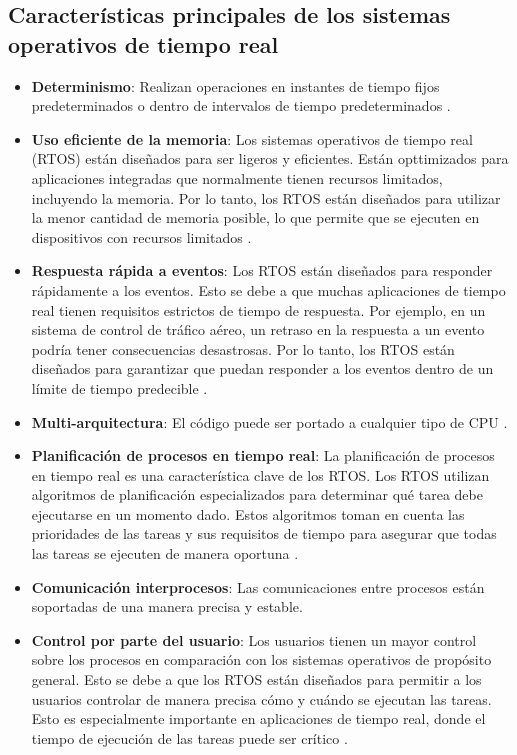 \documentclass{article}
\begin{document}
\subsection{ Características principales de los sistemas operativos de tiempo real}
\begin{itemize}
  \item \textbf{Determinismo}: Realizan operaciones en instantes de tiempo fijos predeterminados o dentro de intervalos de
  tiempo predeterminados \cite{ref1}.

  \item \textbf{Uso eficiente de la memoria}: Los sistemas operativos de tiempo real (RTOS) están diseñados para ser
  ligeros y eficientes. Están opttimizados para aplicaciones integradas que normalmente tienen recursos limitados,
  incluyendo la memoria. Por lo tanto, los RTOS están diseñados para utilizar la menor cantidad de memoria
  posible, lo que permite que se ejecuten en dispositivos con recursos limitados \cite{ref2}.
  
  \item \textbf{Respuesta rápida a eventos}: Los RTOS están diseñados para responder rápidamente a los eventos. Esto se
  debe a que muchas aplicaciones de tiempo real tienen requisitos estrictos de tiempo de respuesta. Por ejemplo,
  en un sistema de control de tráfico aéreo, un retraso en la respuesta a un evento podría tener consecuencias
  desastrosas. Por lo tanto, los RTOS están diseñados para garantizar que puedan responder a los eventos dentro
  de un límite de tiempo predecible \cite{ref2} \cite{ref6}.

  \item \textbf{Multi-arquitectura}: El código puede ser portado a cualquier tipo de CPU \cite{ref1} \cite{ref2}.
  
  \item \textbf{Planificación de procesos en tiempo real}: La planificación de procesos en tiempo real es una característica
  clave de los RTOS. Los RTOS utilizan algoritmos de planificación especializados para determinar qué tarea
  debe ejecutarse en un momento dado. Estos algoritmos toman en cuenta las prioridades de las tareas y sus
  requisitos de tiempo para asegurar que todas las tareas se ejecuten de manera oportuna \cite{ref1} \cite{ref2}.
  
  \item \textbf{Comunicación interprocesos}: Las comunicaciones entre procesos están soportadas de una manera precisa
  y estable.
  
  \item \textbf{Control por parte del usuario}: Los usuarios tienen un mayor control sobre los procesos en comparación con
  los sistemas operativos de propósito general. Esto se debe a que los RTOS están diseñados para permitir a los
  usuarios controlar de manera precisa cómo y cuándo se ejecutan las tareas. Esto es especialmente importante
  en aplicaciones de tiempo real, donde el tiempo de ejecución de las tareas puede ser crítico \cite{ref1} \cite{ref2} 
  \cite{ref5} \cite{ref6} \cite{ref7} \cite{ref10} \cite{ref11}.
\end{itemize}
\end{document}
